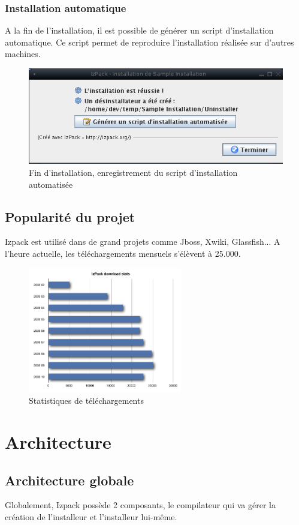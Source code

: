 \subsubsection{Installation automatique}
A la fin de l'installation, il est possible de générer un script d'installation automatique. Ce script permet de reproduire l'installation réalisée sur d'autres machines.
\begin{figure}[H]
	\centering
	\includegraphics[width=12cm]{../image/SaveInstallXML.png}
	\caption{Fin d'installation, enregistrement du script d'installation automatisée}
\end{figure}
\subsection{Popularité du projet}
Izpack est utilisé dans de grand projets comme Jboss, Xwiki, Glassfish... A l'heure actuelle, les téléchargements mensuels s'élèvent à 25.000.
\begin{figure}[H]
	\centering
	\includegraphics[width=0.6\textwidth]{../image/telechargements.png}
	\caption{Statistiques de téléchargements}
\end{figure}
\section{Architecture}
\subsection{Architecture globale}
Globalement, Izpack possède 2 composants, le compilateur qui va gérer la création de l'installeur et l'installeur lui-même.

